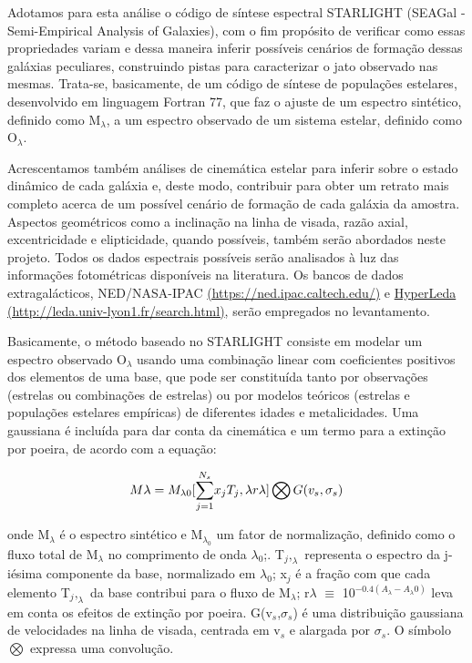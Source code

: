 Adotamos para esta análise o código de síntese espectral STARLIGHT (SEAGal - Semi-Empirical Analysis of Galaxies), com o fim propósito de verificar como essas propriedades variam e dessa maneira inferir possíveis cenários de formação dessas galáxias peculiares, construindo pistas para caracterizar o jato observado nas mesmas. Trata-se, basicamente, de um código de síntese de populações estelares, desenvolvido em linguagem Fortran 77, que faz o ajuste de um espectro sintético, definido como M$_\lambda$, a um espectro observado de um sistema estelar, definido como O$_\lambda$.

Acrescentamos também análises de cinemática estelar para inferir sobre o estado dinâmico de cada galáxia e, deste modo, contribuir para obter um retrato mais completo acerca de um possível cenário de formação de cada galáxia da amostra. Aspectos geométricos como a inclinação na linha de visada, razão axial, excentricidade e elipticidade, quando possíveis, também serão abordados neste projeto. Todos os dados espectrais possíveis serão analisados à luz das informações fotométricas disponíveis na literatura. Os bancos de dados extragalácticos, NED/NASA-IPAC \url{ (https://ned.ipac.caltech.edu/)} e \url{HyperLeda (http://leda.univ-lyon1.fr/search.html)}, serão empregados no levantamento.

Basicamente, o método baseado no STARLIGHT consiste em modelar um espectro observado O$_\lambda$ usando uma combinação linear com coeficientes positivos dos elementos de uma base, que pode ser constituída tanto por observações (estrelas ou combinações de estrelas) ou por modelos teóricos (estrelas e populações estelares empíricas) de diferentes idades e metalicidades. Uma gaussiana é incluída para dar conta da cinemática e um termo para a extinção por poeira, de acordo com a equação:

 \begin{displaymath}
 \centering{
M\lambda=M_{\lambda  0}{[\sum_{j=1}^{N_{s}}}x_jT_j,\lambda r \lambda]\bigotimes G(v_s, \sigma_s)}
\end{displaymath}


\noindent onde M$_{\lambda}$ é o espectro sintético e M$_\lambda_0$ um fator de normalização, definido como o fluxo total de M$_\lambda$ no comprimento de onda $\lambda_0$;. T$_j,_\lambda$ representa o espectro da j-iésima componente da base, normalizado em $\lambda_0$; x$_j$ é a fração com que cada elemento T$_j,_\lambda$ da base contribui para o fluxo de M$_{\lambda}$; r$\lambda$ $\equiv$ 10$^{-0.4(A_\lambda-A_\lambda0)}$ leva em conta os efeitos de extinção por poeira. G(v$_s$,$\sigma_s$) é uma distribuição gaussiana de velocidades na linha de visada, centrada em v$_s$ e alargada por $\sigma_s$. O símbolo $\bigotimes$ expressa uma convolução.

